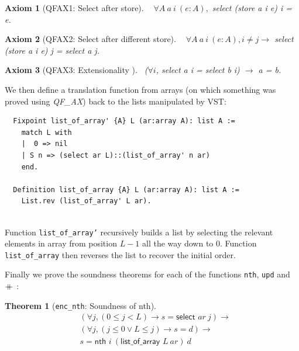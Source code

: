 \documentclass[onecolumn, preprint]{sigplanconf}
\newcommand{\select}[2]{\textsf{select } #1\ #2}
\newcommand{\loa}[2]{\textsf{list\_of\_array } #1\ #2}
\newcommand{\nth}[3]{\textsf{nth } #1\ #2\ #3}
\newcommand\doubleplus{+\kern-1.3ex+\kern0.8ex}
\newtheorem{theorem}{Theorem}
\newtheorem{axiom}{Axiom}
\begin{document}
\begin{axiom}[QFAX1: Select after store] \ \newline 
$\forall A\ a\ i\ (e:A),$ select (store a i e) i = e.
\end{axiom}

\begin{axiom}[QFAX2: Select after different store] \ \newline
$\forall A\ a\ i\ (e:A),  i\not = j \rightarrow$  select (store a i e) j = select a j.
\end{axiom}

\begin{axiom}[QFAX3: Extensionality ] \
\newline ($\forall i$, select a i = select b i) $\rightarrow$ a = b.  
\end{axiom}

We then define a translation function from arrays (on which something was proved using \emph{QF\_AX}) back to the lists manipulated by VST:

\begin{lstlisting}
  Fixpoint list_of_array' {A} L (ar:array A): list A :=
    match L with
    |  0 => nil
    | S n => (select ar L)::(list_of_array' n ar)
    end.

  Definition list_of_array {A} L (ar:array A): list A :=
    List.rev (list_of_array' L ar).
  
\end{lstlisting}

Function \texttt{list\_of\_array'} recursively builds a list by selecting the relevant elements in array from position $L-1$ all the way down to 0. Function \texttt{list\_of\_array} then reverses the list to recover the initial order.

Finally we prove the soundness theorems for each of the functions \texttt{nth}, \texttt{upd} and $\doubleplus$:

\begin{theorem}[\texttt{enc\_nth}: Soundness of \textsf{nth}]

  \begin{align*}
 & (\forall j, (0 \leq j < L) \to s = \select{ar}{j}) \to \\
 & (\forall j, (j \leq 0 \vee L \leq j) \to s = d) \to \\
 & s = \nth{i}{(\loa{L}{ar})}{d} 
\end{align*}

\end{theorem}
\end{document}
